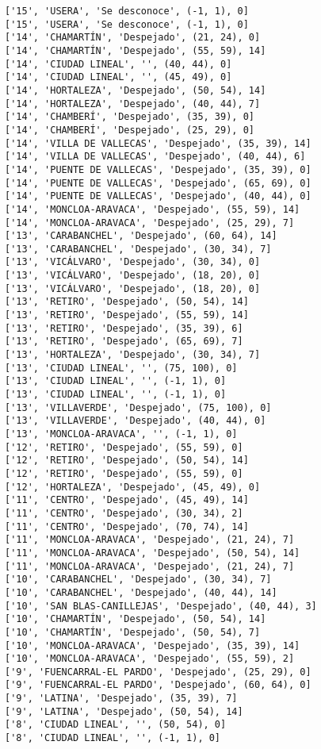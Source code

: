 \documentclass[11pt]{article}
\begin{document}
\begin{Verbatim}[commandchars=\\\{\}]
['15', 'USERA', 'Se desconoce', (-1, 1), 0]
['15', 'USERA', 'Se desconoce', (-1, 1), 0]
['14', 'CHAMARTÍN', 'Despejado', (21, 24), 0]
['14', 'CHAMARTÍN', 'Despejado', (55, 59), 14]
['14', 'CIUDAD LINEAL', '', (40, 44), 0]
['14', 'CIUDAD LINEAL', '', (45, 49), 0]
['14', 'HORTALEZA', 'Despejado', (50, 54), 14]
['14', 'HORTALEZA', 'Despejado', (40, 44), 7]
['14', 'CHAMBERÍ', 'Despejado', (35, 39), 0]
['14', 'CHAMBERÍ', 'Despejado', (25, 29), 0]
['14', 'VILLA DE VALLECAS', 'Despejado', (35, 39), 14]
['14', 'VILLA DE VALLECAS', 'Despejado', (40, 44), 6]
['14', 'PUENTE DE VALLECAS', 'Despejado', (35, 39), 0]
['14', 'PUENTE DE VALLECAS', 'Despejado', (65, 69), 0]
['14', 'PUENTE DE VALLECAS', 'Despejado', (40, 44), 0]
['14', 'MONCLOA-ARAVACA', 'Despejado', (55, 59), 14]
['14', 'MONCLOA-ARAVACA', 'Despejado', (25, 29), 7]
['13', 'CARABANCHEL', 'Despejado', (60, 64), 14]
['13', 'CARABANCHEL', 'Despejado', (30, 34), 7]
['13', 'VICÁLVARO', 'Despejado', (30, 34), 0]
['13', 'VICÁLVARO', 'Despejado', (18, 20), 0]
['13', 'VICÁLVARO', 'Despejado', (18, 20), 0]
['13', 'RETIRO', 'Despejado', (50, 54), 14]
['13', 'RETIRO', 'Despejado', (55, 59), 14]
['13', 'RETIRO', 'Despejado', (35, 39), 6]
['13', 'RETIRO', 'Despejado', (65, 69), 7]
['13', 'HORTALEZA', 'Despejado', (30, 34), 7]
['13', 'CIUDAD LINEAL', '', (75, 100), 0]
['13', 'CIUDAD LINEAL', '', (-1, 1), 0]
['13', 'CIUDAD LINEAL', '', (-1, 1), 0]
['13', 'VILLAVERDE', 'Despejado', (75, 100), 0]
['13', 'VILLAVERDE', 'Despejado', (40, 44), 0]
['13', 'MONCLOA-ARAVACA', '', (-1, 1), 0]
['12', 'RETIRO', 'Despejado', (55, 59), 0]
['12', 'RETIRO', 'Despejado', (50, 54), 14]
['12', 'RETIRO', 'Despejado', (55, 59), 0]
['12', 'HORTALEZA', 'Despejado', (45, 49), 0]
['11', 'CENTRO', 'Despejado', (45, 49), 14]
['11', 'CENTRO', 'Despejado', (30, 34), 2]
['11', 'CENTRO', 'Despejado', (70, 74), 14]
['11', 'MONCLOA-ARAVACA', 'Despejado', (21, 24), 7]
['11', 'MONCLOA-ARAVACA', 'Despejado', (50, 54), 14]
['11', 'MONCLOA-ARAVACA', 'Despejado', (21, 24), 7]
['10', 'CARABANCHEL', 'Despejado', (30, 34), 7]
['10', 'CARABANCHEL', 'Despejado', (40, 44), 14]
['10', 'SAN BLAS-CANILLEJAS', 'Despejado', (40, 44), 3]
['10', 'CHAMARTÍN', 'Despejado', (50, 54), 14]
['10', 'CHAMARTÍN', 'Despejado', (50, 54), 7]
['10', 'MONCLOA-ARAVACA', 'Despejado', (35, 39), 14]
['10', 'MONCLOA-ARAVACA', 'Despejado', (55, 59), 2]
['9', 'FUENCARRAL-EL PARDO', 'Despejado', (25, 29), 0]
['9', 'FUENCARRAL-EL PARDO', 'Despejado', (60, 64), 0]
['9', 'LATINA', 'Despejado', (35, 39), 7]
['9', 'LATINA', 'Despejado', (50, 54), 14]
['8', 'CIUDAD LINEAL', '', (50, 54), 0]
['8', 'CIUDAD LINEAL', '', (-1, 1), 0]

\end{Verbatim}
\end{document}
